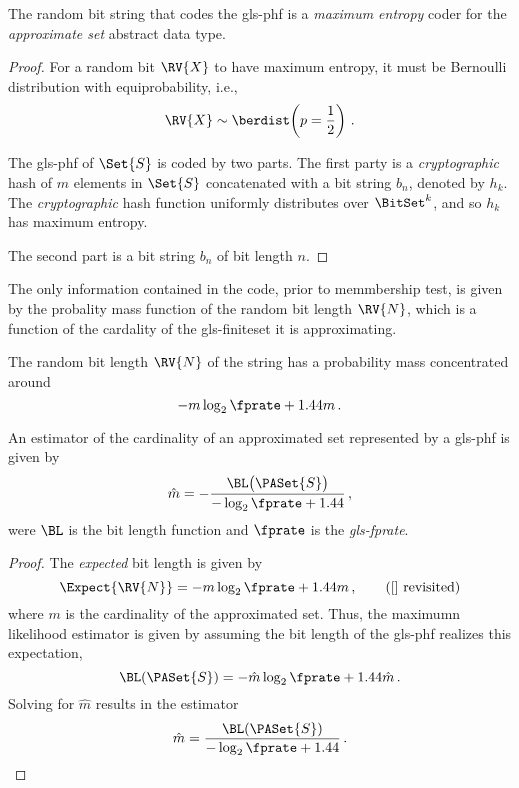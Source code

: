 \documentclass[ ../main.tex]{subfiles}
\begin{document}
\begin{theorem}
The random bit string that codes the \gls{gls-phf} is a \emph{maximum entropy} coder for the \emph{approximate set} abstract data type.
\end{theorem}
\begin{proof}
For a random bit $\RV{X}$ to have maximum entropy, it must be Bernoulli distribution with equiprobability, i.e.,
\begin{equation}
    \RV{X} \sim \berdist\!\left(p = \frac{1}{2}\right)\,.
\end{equation}

The \gls{gls-phf} of $\Set{S}$ is coded by two parts. The first party is a \emph{cryptographic} hash of $m$ elements in $\Set{S}$ concatenated with a bit string $b_n$, denoted by $h_k$. The \emph{cryptographic} hash function uniformly distributes over $\BitSet^{k}$, and so $h_k$ has maximum entropy.

The second part is a bit string $b_n$ of bit length $n$.
\end{proof}

The only information contained in the code, prior to memmbership test, is given by the probality mass function of the random bit length $\RV{N}$, which is a function of the cardality of the \gls{gls-finiteset} it is approximating.

The random bit length $\RV{N}$ of the string has a probability mass concentrated around
\begin{equation}
    -m \log_2 \fprate + 1.44 m\,.
\end{equation}


\begin{theorem}
An estimator of the cardinality of an approximated set represented by a \gls{gls-phf} is given by
\begin{equation}
    \hat{m} = -\frac{\BL\!\left(\PASet{S}\right)}{-\log_2 \fprate + 1.44}\,,
\end{equation}
were $\BL$ is the bit length function and $\fprate$ is the \emph{\gls{gls-fprate}}.
\end{theorem}
\begin{proof}
The \emph{expected} bit length is given by
\begin{equation*}
    \Expect{\RV{N}} = -m \log_2 \fprate + 1.44 m\,, 
    \tag{\ref{} revisited}
\end{equation*}
where $m$ is the cardinality of the approximated set. Thus, the maximumn likelihood estimator is given by assuming the bit length of the \gls{gls-phf} realizes this expectation,
\begin{equation}
    \BL(\PASet{S}) = -\hat{m} \log_2 \fprate + 1.44 \hat{m}\,.
\end{equation}
Solving for $\hat{m}$ results in the estimator
\begin{equation}
    \hat{m} = \frac{\BL(\PASet{S})}{-\log_2 \fprate + 1.44}\,.
\end{equation}
\end{proof}
\end{document}
